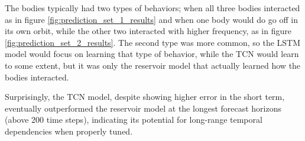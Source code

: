 \documentclass[%
 reprint,
 amsmath,amssymb,
 aps,
]{revtex4-2}
\begin{document}
The bodies typically had two types of behaviors; when all three bodies interacted as in figure \ref{fig:prediction_set_1_results} and when one body would do go off in its own orbit, while the other two interacted with higher frequency, as in figure \ref{fig:prediction_set_2_results}. The second type was more common, so the LSTM model would focus on learning that type of behavior, while the TCN would learn to some extent, but it was only the reservoir model that actually learned how the bodies interacted.

Surprisingly, the TCN model, despite showing higher error in the short term, eventually outperformed the reservoir model at the longest forecast horizons (above 200 time steps), indicating its potential for long-range temporal dependencies when properly tuned.

\end{document}
